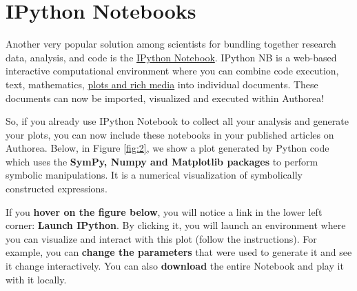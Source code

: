 \section{IPython Notebooks}
Another very popular solution among scientists for bundling together research data, analysis, and code is the \href{http://ipython.org/notebook.html}{IPython Notebook}. IPython NB is a web-based interactive computational environment where you can combine code execution, text, mathematics, \href{http://jakevdp.github.io/blog/2013/12/05/static-interactive-widgets/}{plots and rich media} into individual documents. These documents can now be imported, visualized and executed within Authorea!

So, if you already use IPython Notebook to collect all your analysis and generate your plots, you can now include these notebooks in your published articles on Authorea. Below, in Figure \ref{fig:2}, we show a plot generated by Python code which uses the \textbf{SymPy, Numpy and Matplotlib packages} to perform symbolic manipulations. It is a numerical visualization of symbolically constructed expressions.

If you \textbf{hover on the figure below}, you will notice a link in the lower left corner: \textbf{Launch IPython}. By clicking it, you will launch an environment where you can visualize and interact with this plot (follow the instructions). For example, you can \textbf{change the parameters} that were used to generate it and see it change interactively. You can also \textbf{download} the entire Notebook and play it with it locally.  